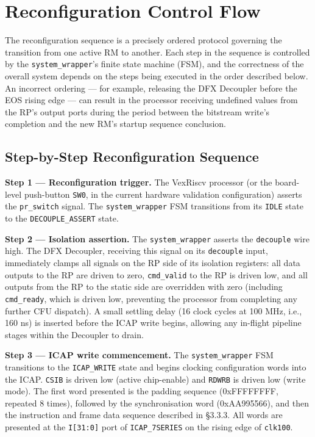 \section{Reconfiguration Control Flow}

The reconfiguration sequence is a precisely ordered protocol governing the transition from one active RM to another. Each step in the sequence is controlled by the \texttt{system\_wrapper}'s finite state machine (FSM), and the correctness of the overall system depends on the steps being executed in the order described below. An incorrect ordering — for example, releasing the DFX Decoupler before the EOS rising edge — can result in the processor receiving undefined values from the RP's output ports during the period between the bitstream write's completion and the new RM's startup sequence conclusion.

\subsection{Step-by-Step Reconfiguration Sequence}

\textbf{Step 1 — Reconfiguration trigger.} The VexRiscv processor (or the board-level push-button \texttt{SW0}, in the current hardware validation configuration) asserts the \texttt{pr\_switch} signal. The \texttt{system\_wrapper} FSM transitions from its \texttt{IDLE} state to the \texttt{DECOUPLE\_ASSERT} state.

\textbf{Step 2 — Isolation assertion.} The \texttt{system\_wrapper} asserts the \texttt{decouple} wire high. The DFX Decoupler, receiving this signal on its \texttt{decouple} input, immediately clamps all signals on the RP side of its isolation registers: all data outputs to the RP are driven to zero, \texttt{cmd\_valid} to the RP is driven low, and all outputs from the RP to the static side are overridden with zero (including \texttt{cmd\_ready}, which is driven low, preventing the processor from completing any further CFU dispatch). A small settling delay (16 clock cycles at 100 MHz, i.e., 160 ns) is inserted before the ICAP write begins, allowing any in-flight pipeline stages within the Decoupler to drain.

\textbf{Step 3 — ICAP write commencement.} The \texttt{system\_wrapper} FSM transitions to the \texttt{ICAP\_WRITE} state and begins clocking configuration words into the ICAP. \texttt{CSIB} is driven low (active chip-enable) and \texttt{RDWRB} is driven low (write mode). The first word presented is the padding sequence (0xFFFFFFFF, repeated 8 times), followed by the synchronisation word (0xAA995566), and then the instruction and frame data sequence described in §3.3.3. All words are presented at the \texttt{I[31:0]} port of \texttt{ICAP\_7SERIES} on the rising edge of \texttt{clk100}.

